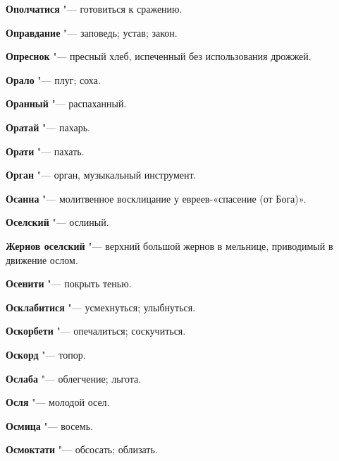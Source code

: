 \begin{mymulticols}{2}
\noindent\textbf{Ополчатися} "--- готовиться к сражению. 




\noindent\textbf{Оправдание} "--- заповедь; устав; закон. 




\noindent\textbf{Опреснок} "--- пресный хлеб, испеченный без использования дрожжей. 




\noindent\textbf{Орало} "--- плуг; соха. 




\noindent\textbf{Оранный} "--- распаханный. 




\noindent\textbf{Оратай} "--- пахарь. 




\noindent\textbf{Орати} "--- пахать. 




\noindent\textbf{Орган} "--- орган, музыкальный инструмент. 




\noindent\textbf{Осанна} "--- молитвенное восклицание у евреев-«спасение (от Бога)». 




\noindent\textbf{Оселский} "--- ослиный. 




\noindent\textbf{Жернов оселский} "--- верхний большой жернов в мельнице, приводимый в движение ослом. 




\noindent\textbf{Осенити} "--- покрыть тенью. 




\noindent\textbf{Осклабитися} "--- усмехнуться; улыбнуться. 




\noindent\textbf{Оскорбети} "--- опечалиться; соскучиться. 




\noindent\textbf{Оскорд} "--- топор. 




\noindent\textbf{Ослаба} "--- облегчение; льгота. 




\noindent\textbf{Осля} "--- молодой осел. 




\noindent\textbf{Осмица} "--- восемь. 




\noindent\textbf{Осмоктати} "--- обсосать; облизать. 





\end{mymulticols}
